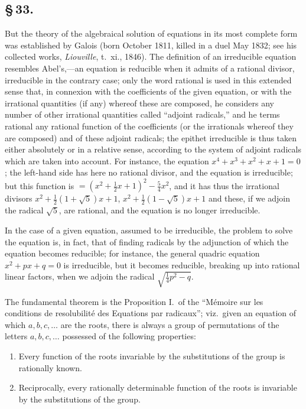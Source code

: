 \documentclass[11pt,a4paper]{book}
\begin{document}
\subsection*{\S\,33.}

But the theory of the algebraical solution of equations in its most complete form was established by Galois (born October 1811, killed in a duel May 1832; see his collected works, \textit{Liouville}, t.~xi., 1846). The definition of an irreducible equation resembles Abel's,---an equation is reducible when it admits of a rational divisor, irreducible in the contrary case; only the word rational is used in this extended sense that, in connexion with the coefficients of the given equation, or with the irrational quantities (if any) whereof these are composed, he considers any number of other irrational quantities called ``adjoint radicals,'' and he terms rational any rational function of the coefficients (or the irrationals whereof they are composed) and of these adjoint radicals; the epithet irreducible is thus taken either absolutely or in a relative sense, according to the system of adjoint radicals which are taken into account. For instance, the equation $x^{4} + x^{3} + x^{2} + x + 1 = 0$; the left-hand side has here no rational divisor, and the equation is irreducible; but this function is $= (x^{2} + \frac{1}{2}x + 1)^{2} - \frac{5}{4}x^{2}$, and it has thus the irrational divisors $x^{2} + \frac{1}{2}(1 + \sqrt{5})x + 1$, $x^{2} + \frac{1}{2}(1 - \sqrt{5})x + 1$ and these, if we adjoin the radical $\sqrt{5}$, are rational, and the equation is no longer irreducible.

In the case of a given equation, assumed to be irreducible, the problem to solve the equation is, in fact, that of finding radicals by the adjunction of which the equation becomes reducible; for instance, the general quadric equation $x^{2} + px + q = 0$ is irreducible, but it becomes reducible, breaking up into rational linear factors, when we adjoin the radical $\sqrt{\frac{1}{4}p^{2} - q}$.

The fundamental theorem is the Proposition I.\ of the ``M\'{e}moire sur les conditions de resolubilit\'{e} des Equations par radicaux''; viz.\ given an equation of which $a, b, c, \ldots$ are the roots, there is always a group of permutations of the letters $a, b, c, \ldots$ possessed of the following properties:
\begin{enumerate}
\item Every function of the roots invariable by the substitutions of the group is rationally known.
\item Reciprocally, every rationally determinable function of the roots is invariable by the substitutions of the group.
\end{enumerate}
\end{document}
